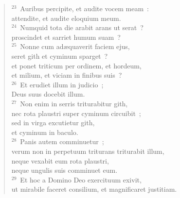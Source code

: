\begin{flushleft}\begin{verse}${}^{23}$~Auribus percipite, et audite vocem meam~:\\ attendite, et audite eloquium meum.\\
${}^{24}$~Numquid tota die arabit arans ut serat~?\\ proscindet et sarriet humum suam~?\\
${}^{25}$~Nonne cum ad\ae quaverit faciem ejus,\\ seret gith et cyminum sparget~?\\ et ponet triticum per ordinem, et hordeum,\\ et milium, et viciam in finibus suis~?\\
${}^{26}$~Et erudiet illum in judicio~;\\ Deus suus docebit illum.\\
${}^{27}$~Non enim in serris triturabitur gith,\\ nec rota plaustri super cyminum circuibit~;\\ sed in virga excutietur gith,\\ et cyminum in baculo.\\
${}^{28}$~Panis autem comminuetur~;\\ verum non in perpetuum triturans triturabit illum,\\ neque vexabit eum rota plaustri,\\ neque ungulis suis comminuet eum.\\
${}^{29}$~Et hoc a Domino Deo exercituum exivit,\\ ut mirabile faceret consilium, et magnificaret justitiam.\end{verse}\end{flushleft}


